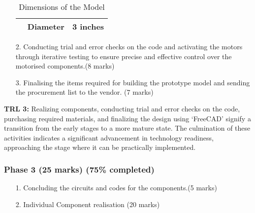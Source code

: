 \documentclass[table,french,english]{rapportCS}
\begin{document}
\begin{enumerate}
\begin{table}[h]
\begin{center}
\begin{tabular}{|>{\centering\arraybackslash}c|p{7.5cm}|r|}
  \hline 
  \multicolumn{1}{|c|}{\multirow{1}{2cm}{\textbf{Fan}}} & Diameter & 3 inches\\
  \hline
\end{tabular}
\caption{Dimensions of the Model}
\end{center}
\end{table}
\newpage
    \item[2.] Conducting trial and error checks on the code and activating the motors through iterative testing to ensure precise and effective control over the motorised components.(8 marks)
    \item[3.] Finalising the items required for building the prototype model and sending the procurement list to the vendor. (7 marks)
\end{enumerate}
\textbf{TRL 3:} Realizing components, conducting trial and error checks on the code, purchasing required materials, and finalizing the design using ‘FreeCAD’ signify a transition from the early stages to a more mature state. The culmination of these activities indicates a significant advancement in technology readiness, approaching the stage where it can be practically implemented.

\vspace{1cm}
\subsubsection*{Phase 3 (25 marks) (75\% completed)}
\begin{enumerate}

    \item[1.] Concluding the circuits and codes for the components.(5 marks)
    \item[2.] Individual Component realisation (20 marks)
\end{enumerate}
\end{document}
